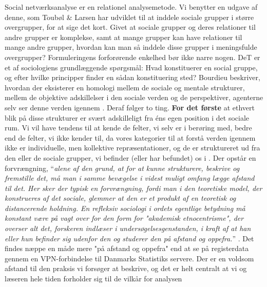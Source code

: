 Social netværksanalyse er en relationel analysemetode. Vi benytter en udgave af denne, som Toubøl \& Larsen har udviklet til at inddele sociale grupper i større overgrupper, for at sige det kort. Givet at sociale grupper og deres relationer til andre grupper er komplekse, samt at mange grupper kan have relationer til mange andre grupper, hvordan kan man så inddele disse grupper i meningsfulde overgrupper? Formuleringens forforørende enkelhed bør ikke narre nogen. DeT er et af sociologiens grundlæggende spørgsmål: Hvad konstituerer en social gruppe, og efter hvilke principper finder en sådan konstituering sted? Bourdieu beskriver, hvordan der eksisterer en homologi mellem de sociale og mentale strukturer, mellem de objektive adskillelser i den sociale verden og de perspektiver, agenterne selv ser denne verden igennem \parencite[12]{Bourdieu1992}. Deraf følger to ting. \textbf{For det første} at ethvert blik på disse strukturer er svært adskilleligt fra éns egen position i det sociale rum. Vi vil have tendens til at kende de felter, vi selv er i berøring med, bedre end de felter, vi ikke kender til, da vores kategorier til at forstå verden igennem ikke er individuelle, men kollektive repræsentationer, og de er struktureret ud fra den eller de sociale grupper, vi befinder (eller har befundet) os i \parencite[12]{Bourdieu1992}. Der opstår en forvrængning, “\emph{alene af den grund, at for at kunne strukturere, beskrive og fremstille det, må man i samme bevægelse i videst muligt omfang lægge afstand til det. Her sker der typisk en forvrængning, fordi man i den teoretiske model, der konstrueres af det sociale, glemmer at den er et produkt af en teoretisk og distancerende holdning. En refleksiv sociologi i ordets egentlige betydning må konstant være på vagt over for den form for "akademisk etnocentrisme", der overser alt det, forskeren indlæser i undersøgelsesgenstanden, i kraft af at han eller hun befinder sig udenfor den og studerer den på afstand og oppefra.}” \parencite[62]{Bourdieu1996}. Det findes næppe en måde mere "på afstand og oppefra" end at se på registerdata gennem en VPN-forbindelse til Danmarks Statistiks servere. Der er en voldsom afstand til den praksis vi forsøger at beskrive, og det er helt centralt at vi og læseren hele tiden forholder sig til de vilkår for analysen%
%
